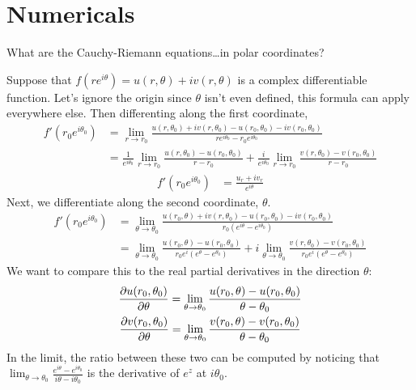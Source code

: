 \documentclass{homework}
\begin{document}
\section{Numericals}

\begin{problem}\label{cauchy-riemann-polar}
What are the Cauchy-Riemann equations\ldots in polar coordinates?
\end{problem}
\begin{solution}
Suppose that $f(re^{i\theta}) = u(r, \theta) + iv(r, \theta)$ is a complex differentiable  function. Let's ignore the origin since $\theta$ isn't even defined, this formula can apply everywhere else. Then differenting along the first coordinate,
\begin{align*}
f'(r_0e^{i\theta_0}) &=  \lim_{r\to r_0} \frac{u(r, \theta_0) + iv(r, \theta_0) - u(r_0, \theta_0) - iv(r_0, \theta_0)}{re^{i\theta_0} - r_0e^{i\theta_0}}\\
&= \frac{1}{e^{i\theta_0}}\lim_{r\to r_0} \frac{u(r, \theta_0) - u(r_0, \theta_0)}{r - r_0} + \frac{i}{e^{i\theta_0}} \lim_{r\to r_0} \frac{v(r, \theta_0) - v(r_0, \theta_0)}{r - r_0}
\end{align*}
\begin{align}\label{first_rc_polar}
f'(r_0e^{i\theta_0}) &= \frac{u_r + iv_r}{e^{i\theta}}
\end{align}
Next, we differentiate along the second coordinate, $\theta$. 
\begin{align*}
f'(r_0e^{i\theta_0}) &=  \lim_{\theta\to \theta_0} \frac{u(r_0, \theta) + iv(r, \theta_0) - u(r_0, \theta_0) - iv(r_0, \theta_0)}{r_0(e^{i\theta} - e^{i\theta_0})}\\
&= \lim_{\theta\to \theta_0} \frac{u(r_0, \theta) - u(r_0, \theta_0)}{r_0e^{i}(e^\theta - e^{\theta_0})} + i \lim_{\theta\to \theta_0} \frac{v(r, \theta_0) - v(r_0, \theta_0)}{r_0e^{i}(e^\theta - e^{\theta_0})}
\end{align*}
We want to compare this to the real partial derivatives in the direction $\theta$:
\begin{gather*}
\frac{\partial u(r_0, \theta_0)}{\partial \theta} = \lim_{\theta\to \theta_0} \frac{u(r_0, \theta) - u(r_0, \theta_0)}{\theta - \theta_0}\\
\frac{\partial v(r_0, \theta_0)}{\partial \theta} = \lim_{\theta\to \theta_0} \frac{v(r_0, \theta) - v(r_0, \theta_0)}{\theta - \theta_0}
\end{gather*}
In the limit, the ratio between these two can be computed by noticing that $\lim_{\theta\to\theta_0}\frac{e^{i\theta} - e^{i\theta_0}}{i\theta - i\theta_0}$ is the derivative of $e^z$ at $i\theta_0$.

\end{solution}
\end{document}
